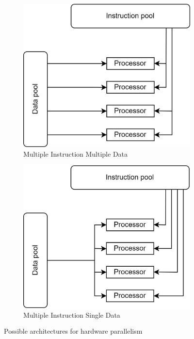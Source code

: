 \begin{figure}[H]
    \centering
    \begin{subfigure}{0.49\textwidth}
        \centering
        \includegraphics[width=0.6\linewidth]{images/mimd.png} 
        \caption{Multiple Instruction Multiple Data}
    \end{subfigure}
    \begin{subfigure}{0.49\textwidth}
        \centering
        \includegraphics[width=0.6\linewidth]{images/misd.png}
        \caption{Multiple Instruction Single Data}
    \end{subfigure}
    \caption{Possible architectures for hardware parallelism}
\end{figure}